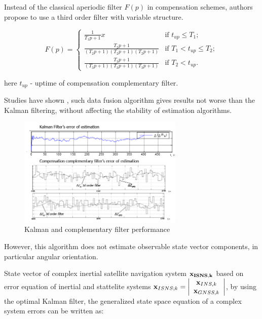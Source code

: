 \documentclass[conference, utf8]{IEEEtran}
\begin{document}
Instead of the classical aperiodic filter $F(p)$ in compensation schemes, authors 
propose to use a third order filter with variable structure.

\begin{equation}
\displaystyle F(p) = \left\{ 
    \begin{array}{ll}
       \displaystyle \frac{1}{T_{1} p+1} x & \mbox{if $t_{up} \le T_{1}$};\\
       \displaystyle \frac{T_{2} p+1}{(T_{2} p+1)(T_{2} p+1)(T_{2} p+1)} & \mbox{if $T_{1} <t_{up} \le T_{2}$};\\
       \displaystyle \frac{T_{3} p+1}{(T_{3} p+1)(T_{3} p+1)(T_{3} p+1)}& \mbox{if $T_{2} < t_{up}$}.
    \end{array} 
\right.
\label{eq:comp_f}
\end{equation}

here $t_{up}$ - uptime of compensation complementary filter. 

Studies have shown \cite{bib:rogozhyn}, such data fusion algorithm gives results not worse than the 
Kalman filtering, without affecting the stability of estimation algorithms.

\begin{figure}[!t]
  \centering
  \includegraphics[width=3.1in]{f22}
  \caption{Kalman and complementary filter performance}
  \label{fig:sim_kalman}
\end{figure}

However, this algorithm does not estimate observable state vector components, in particular angular orientation.

State vector of complex inertial satellite navigation system $\bf{x_{ISNS,k}} $ 
based on error equation of inertial and stattelite systems 
${\bf x}_{ISNS;k} =
\left|\begin{array}{c} {{\bf x}_{INS,k} } \\ {{\bf x}_{GNSS,k} } \end{array}\right|$, 
by using the optimal Kalman filter, the generalized state space  equation of a complex system errors can be written as:
\end{document}
